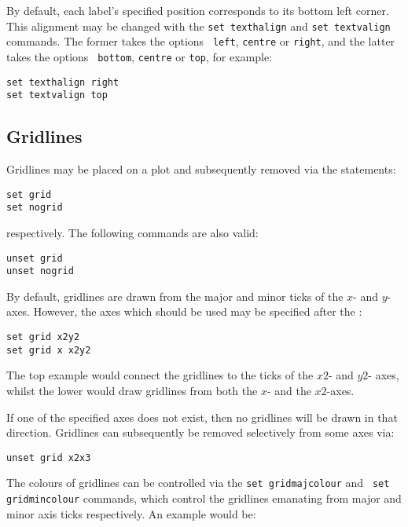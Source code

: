 By default, each label's specified
position corresponds to its bottom left corner. This alignment may be changed
with the {\tt set texthalign} and {\tt set
textvalign} commands. The former takes the options {\tt
left}, {\tt centre} or {\tt right}, and the latter takes the options {\tt
bottom}, {\tt centre} or {\tt top}, for example:

\begin{verbatim}
set texthalign right
set textvalign top
\end{verbatim}

\subsection{Gridlines}

Gridlines may be placed on a plot and subsequently removed via the statements:

\begin{verbatim}
set grid
set nogrid
\end{verbatim}

\noindent respectively. The following commands are also valid:

\begin{verbatim}
unset grid
unset nogrid
\end{verbatim}

\noindent By default, gridlines are drawn from the major and minor ticks of the
$x$- and $y$-axes. However, the axes which should be used may be specified
after the :

\begin{verbatim}
set grid x2y2
set grid x x2y2
\end{verbatim}

\noindent The top example would connect the gridlines to the ticks of the $x2$-
and $y2$- axes, whilst the lower would draw gridlines from both the $x$- and
the $x2$-axes.

If one of the specified axes does not exist, then no gridlines will be drawn in
that direction.  Gridlines can subsequently be removed selectively from some
axes via:

\begin{verbatim}
unset grid x2x3
\end{verbatim}

The colours of gridlines can be
controlled via the {\tt set gridmajcolour} and {\tt
set gridmincolour} commands, which control the
gridlines emanating from major and minor axis ticks respectively. An example
would be:

